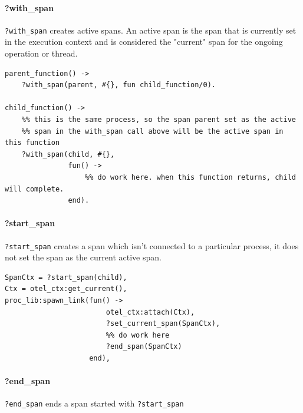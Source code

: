         \paragraph{?with\_span}
            \texttt{?with\_span} creates active spans. An active span is the span that is currently set in the execution context and is considered the "current" span for the ongoing operation or thread. \cite{active-s}
        \begin{verbatim}
parent_function() ->
    ?with_span(parent, #{}, fun child_function/0).

child_function() ->
    %% this is the same process, so the span parent set as the active
    %% span in the with_span call above will be the active span in this function
    ?with_span(child, #{},
               fun() ->
                   %% do work here. when this function returns, child will complete.
               end).
        \end{verbatim}

        \paragraph{?start\_span}
            \texttt{?start\_span} creates a span which isn't connected to a particular process, it does not set the span as the current active span.
        \begin{verbatim}
SpanCtx = ?start_span(child),
Ctx = otel_ctx:get_current(),
proc_lib:spawn_link(fun() ->
                        otel_ctx:attach(Ctx),
                        ?set_current_span(SpanCtx),
                        %% do work here
                        ?end_span(SpanCtx)
                    end),
        \end{verbatim}

        \paragraph{?end\_span}
            \texttt{?end\_span} ends a span started with \texttt{?start\_span}

